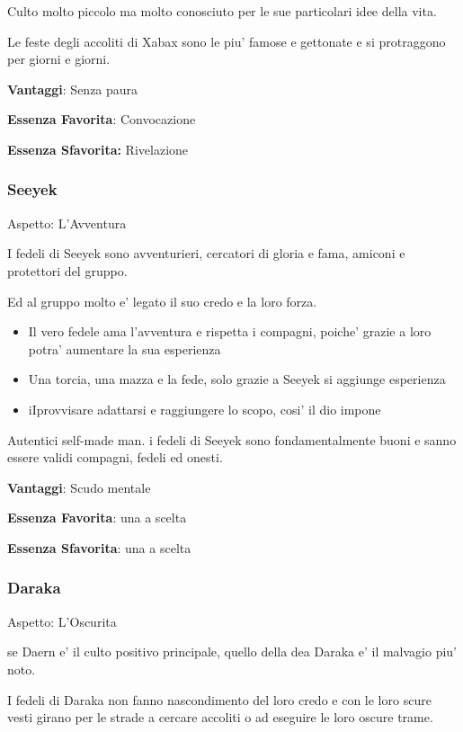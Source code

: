\documentclass[a4paper,11pt,twoside,openany]{book}
\begin{document}
Culto molto piccolo ma molto conosciuto per le sue particolari idee della vita.

Le feste degli accoliti di Xabax sono le piu' famose e gettonate e si protraggono per giorni e giorni.


\textbf{Vantaggi}: Senza paura

\textbf{Essenza Favorita}: Convocazione

\textbf{Essenza Sfavorita:} Rivelazione
\bigskip

\subsubsection{Seeyek}

Aspetto: L'Avventura
\bigskip

I fedeli di Seeyek sono avventurieri, cercatori di gloria e fama, amiconi e protettori del gruppo.

Ed al gruppo molto e' legato il suo credo e la loro forza.


\begin{itemize}
	\item Il vero fedele ama l'avventura e rispetta i compagni, poiche' grazie a loro potra' aumentare la sua esperienza
	\item Una torcia, una mazza e la fede, solo grazie a Seeyek si aggiunge esperienza
	\item iIprovvisare adattarsi e raggiungere lo scopo, cosi' il dio impone
\end{itemize}

Autentici self-made man. i fedeli di Seeyek sono fondamentalmente buoni e sanno essere validi compagni, fedeli ed onesti.


\textbf{Vantaggi}: Scudo mentale

\textbf{Essenza Favorita}: una a scelta

\textbf{Essenza Sfavorita}: una a scelta
\bigskip

\subsubsection{Daraka}

Aspetto: L'Oscurita
\bigskip

se Daern e' il culto positivo principale, quello della dea Daraka e' il malvagio piu' noto.

I fedeli di Daraka non fanno nascondimento del loro credo e con le loro scure vesti girano per le strade a cercare accoliti o ad eseguire le loro oscure trame.
\end{document}
